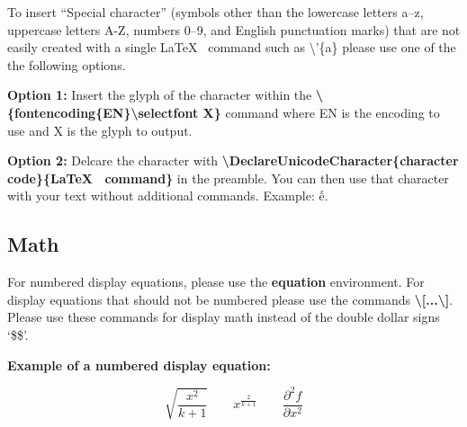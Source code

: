 \documentclass{csmagazine}
\begin{document}
\begin{flushleft}
To insert ``Special character'' (symbols other than the lowercase letters a–z, uppercase letters A-Z, numbers 0–9, and English punctuation marks) that are not easily created with a single \LaTeX~ command such as \textbackslash{}'\{a\} please use one of the the following options.

\textbf{Option 1:} Insert the glyph of the character within the \textbf{\textbackslash{}\{fontencoding\{EN\}\textbackslash{}selectfont X\}} command where EN is the encoding to use and X is the glyph to output.


\textbf{Option 2:} Delcare the character with \textbf{\textbackslash{}DeclareUnicodeCharacter\{character code\}\{\LaTeX~ command\}} in the preamble. You can then use that character with your text without additional commands. Example: ế.




\subsection{Math}

For numbered display equations, please use the \textbf{equation} environment. For display equations that should not be numbered please use the commands \textbf{\textbackslash[...\textbackslash]}. Please use these commands for display math instead of the double dollar signs `\$\$'.

\textbf{Example of a numbered display equation:}

\begin{equation}
\sqrt{\frac{x^2}{k+1}}\qquad
x^\frac{2}{k+1}\qquad
\frac{\partial^2f}{\partial x^2}
\end{equation}


\end{flushleft}
\end{document}
